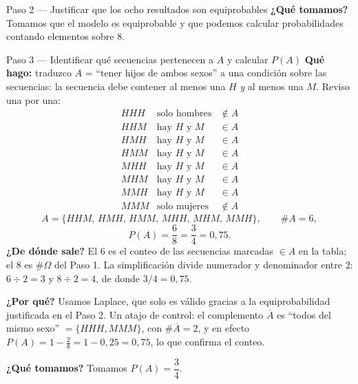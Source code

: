 \documentclass[11pt]{article}
\begin{document}
\begin{sol}
\begin{paso}{Paso 2 --- Justificar que los ocho resultados son equiprobables}
\textbf{¿Qué tomamos?} Tomamos que el modelo es equiprobable y que podemos calcular
probabilidades contando elementos sobre $8$.
\end{paso}

\begin{paso}{Paso 3 --- Identificar qué secuencias pertenecen a $A$ y calcular $P(A)$}
\textbf{Qué hago:} traduzco $A$ = ``tener hijos de ambos sexos'' a una condición sobre las
secuencias: la secuencia debe contener al menos una $H$ \emph{y} al menos una $M$. Reviso una
por una:
\[
\begin{array}{llc}
HHH & \text{solo hombres} & \notin A\\
HHM & \text{hay } H \text{ y } M & \in A\\
HMH & \text{hay } H \text{ y } M & \in A\\
HMM & \text{hay } H \text{ y } M & \in A\\
MHH & \text{hay } H \text{ y } M & \in A\\
MHM & \text{hay } H \text{ y } M & \in A\\
MMH & \text{hay } H \text{ y } M & \in A\\
MMM & \text{solo mujeres} & \notin A
\end{array}
\]
\[
A=\{HHM,\,HMH,\,HMM,\,MHH,\,MHM,\,MMH\},\qquad \#A=6,
\]
\[
P(A)=\frac{6}{8}=\frac{3}{4}=0{,}75 .
\]
\textbf{¿De dónde sale?} El $6$ es el conteo de las secuencias marcadas $\in A$ en la tabla;
el $8$ es $\#\Omega$ del Paso 1. La simplificación divide numerador y denominador entre $2$:
$6\div2=3$ y $8\div2=4$, de donde $3/4=0{,}75$.

\textbf{¿Por qué?} Usamos Laplace, que solo es válido gracias a la equiprobabilidad
justificada en el Paso 2. Un atajo de control: el complemento $\overline{A}$ es ``todos del
mismo sexo'' $=\{HHH,MMM\}$, con $\#\overline{A}=2$, y en efecto
$P(A)=1-\frac{2}{8}=1-0{,}25=0{,}75$, lo que confirma el conteo.

\textbf{¿Qué tomamos?} Tomamos $P(A)=\dfrac{3}{4}$.
\end{paso}


\end{sol}
\end{document}
